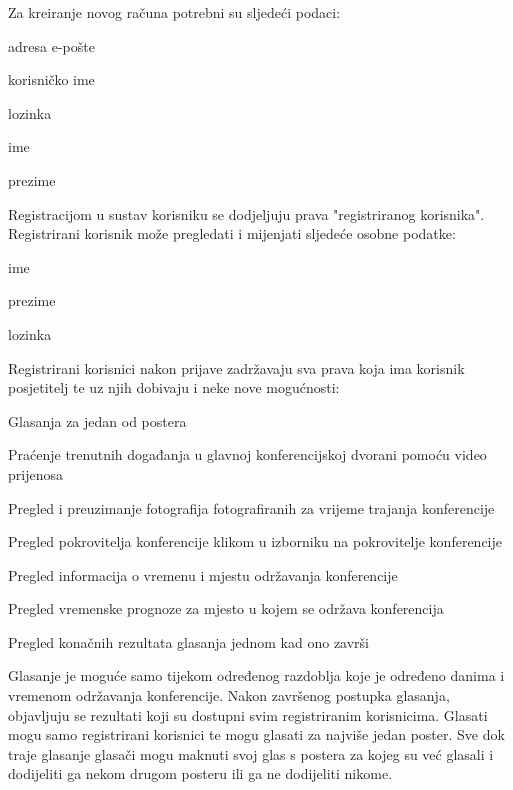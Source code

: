 		Za kreiranje novog računa potrebni su sljedeći podaci:
		\begin{packed_item}
			\item adresa e-pošte
			\item korisničko ime
			\item lozinka
			\item ime
			\item prezime
		\end{packed_item}
		
		Registracijom u sustav korisniku se dodjeljuju prava "registriranog korisnika". Registrirani korisnik može pregledati i mijenjati sljedeće osobne podatke:
		\begin{packed_item}
			\item ime
			\item prezime
			\item lozinka
		\end{packed_item}

		Registrirani korisnici nakon prijave zadržavaju sva prava koja ima korisnik posjetitelj te uz njih dobivaju i neke nove mogućnosti:
		\begin{packed_item}
			\item Glasanja za jedan od postera
			\item Praćenje trenutnih događanja u glavnoj konferencijskoj dvorani pomoću video prijenosa
			\item Pregled i preuzimanje fotografija fotografiranih za vrijeme trajanja konferencije
			\item Pregled pokrovitelja konferencije klikom u izborniku na pokrovitelje konferencije
			\item Pregled informacija o vremenu i mjestu održavanja konferencije
			\item Pregled vremenske prognoze za mjesto u kojem se održava konferencija
			\item Pregled konačnih rezultata glasanja jednom kad ono završi
		\end{packed_item}
		
		Glasanje je moguće samo tijekom određenog razdoblja koje je određeno danima i vremenom održavanja konferencije. Nakon završenog postupka glasanja, objavljuju se rezultati koji su dostupni svim registriranim korisnicima. Glasati mogu samo registrirani korisnici te mogu glasati za najviše jedan poster. Sve dok traje glasanje glasači mogu maknuti svoj glas s postera za kojeg su već glasali i dodijeliti ga nekom drugom posteru ili ga ne dodijeliti nikome.
		
